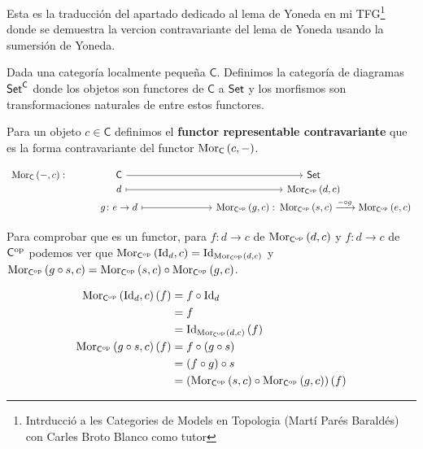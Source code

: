 Esta es la traducción del apartado dedicado al lema de Yoneda en mi TFG\footnote{Intrducció a les Categories de Models en Topologia (Martí Parés Baraldés) con Carles Broto Blanco como tutor} donde se demuestra la vercion contravariante del lema de Yoneda usando la sumersión de Yoneda. 

\begin{definition}\label{def:diagCat}
  Dada una categoría localmente pequeña $\mathsf{C}$. Definimos la categoría de diagramas $\textup{\textsf{Set}}^{\mathsf{C}}$ donde los objetos son functores de $\mathsf{C}$ a $\textup{\textsf{Set}}$ y los morfismos son transformaciones naturales de entre estos functores.
\end{definition}


\begin{definition}\label{def:Mor(-,c)}
  Para un objeto $c \in \mathsf{C}$ definimos el {\bf functor representable contravariante} que es la forma contravariante del functor $\operatorname{\mathrm{Mor}}_{\mathsf{C}}\left(c,-\right)$.

  \begin{equation*}
    \begin{tikzcd}[row sep = -0.1 cm]
    \Mor{\mathsf{C}}{-,c} \colon & \mathsf{C} \arrow[rrr] & & & \Set  \\
    & d \arrow[rrr,mapsto] & & & \Mor{\mathsf{C}^{\op}}{d,c} \\
    & g\colon e \rightarrow d \arrow[rrr,mapsto] & & & \Mor{\mathsf{C}^{\op}}{g,c}\colon \Mor{\mathsf{C}^\op}{s,c} \xrightarrow{-\circ g} \Mor{\mathsf{C}^\op}{e,c}
  \end{tikzcd}
  \end{equation*}

  Para comprobar que es un functor, para $f\colon d \rightarrow c$ de $\operatorname{\mathrm{Mor}}_{\mathsf{C}^{\mathrm{op}}}\left(d,c\right)$ y $f\colon d \rightarrow c$ de $\mathsf{C}^{\mathrm{op}}$ podemos ver que $\operatorname{\mathrm{Mor}}_{\mathsf{C}^{\mathrm{op}}}\left(\mathrm{Id}_{d},c\right)=\mathrm{Id}_{\operatorname{\mathrm{Mor}}_{\mathsf{C}^{\mathrm{op}}}\left(d,c\right)}$ y $\operatorname{\mathrm{Mor}}_{\mathsf{C}^{\mathrm{op}}}\left(g \circ s,c\right)=\operatorname{\mathrm{Mor}}_{\mathsf{C}^{\mathrm{op}}}\left(s,c\right) \circ \operatorname{\mathrm{Mor}}_{\mathsf{C}^{\mathrm{op}}}\left(g,c\right)$.


\begin{align*}
  \operatorname{\mathrm{Mor}}_{\mathsf{C}^{\mathrm{op}}}\left(\mathrm{Id}_{d},c\right)\left(f\right)  &= f\circ \mathrm{Id}_{d} \\ 
  &= f \\ 
  &= \mathrm{Id}_{\operatorname{\mathrm{Mor}}_{\mathsf{C}^{\mathrm{op}}}\left(d,c\right)}\left(f\right) \\ 
  \operatorname{\mathrm{Mor}}_{\mathsf{C}^{\mathrm{op}}}\left(g\circ s, c\right)\left(f\right)  &= f\circ \left(g\circ s\right) \\ 
    &= \left(f\circ g\right)\circ s \\ 
  &=  \left(\operatorname{\mathrm{Mor}}_{\mathsf{C}^{\mathrm{op}}}\left(s,c\right)\circ \operatorname{\mathrm{Mor}}_{\mathsf{C}^{\mathrm{op}}}\left(g,c\right)\right)\left(f\right)
\end{align*}

\end{definition}


